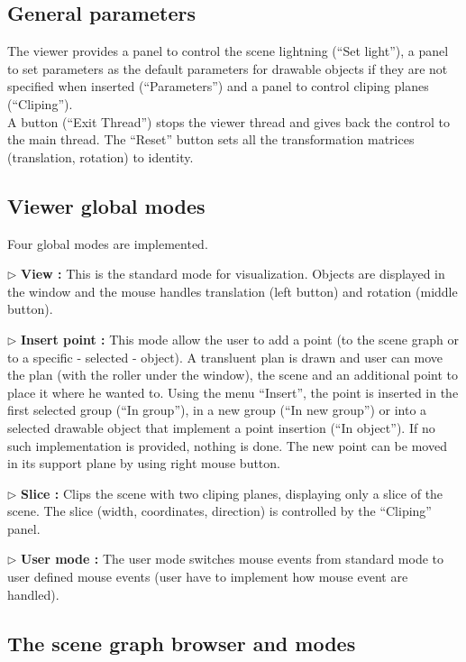 \subsection{General parameters}

The viewer provides a panel to control the scene lightning (``Set
light''), a panel to set parameters as the default parameters for
drawable objects if they are not specified when inserted
(``Parameters'') and a panel to control cliping planes (``Cliping''). \\
A button (``Exit Thread'') stops the viewer thread and gives back the
control to the main thread. The ``Reset'' button sets all the
transformation matrices (translation, rotation) to identity.

\subsection{Viewer global modes}

Four global modes are implemented. 
\begin{description}
\item{$\triangleright$} {\bf View : } This is the standard mode for
visualization. Objects are displayed in the  window and
the mouse handles translation (left button) and rotation (middle button).
\item{$\triangleright$} {\bf Insert point : } This mode allow the user 
to add a point (to the scene graph or to a specific - selected -
object). A transluent plan is drawn and user can move the
plan (with the roller under the window), the scene and an additional point to
place it where he wanted to. Using the menu ``Insert'', the point is
inserted in the first selected group (``In group''), in a new group
(``In new group'') or into a selected drawable object that implement a point
insertion (``In object''). If no such implementation is provided,
nothing is done. The new point can be moved in its support plane by
using right mouse button.
\item{$\triangleright$} {\bf Slice : } Clips the scene with two
cliping planes, displaying only a slice of the scene. The slice
(width, coordinates, direction) is controlled by the ``Cliping''
panel.
\item{$\triangleright$} {\bf User mode : } The user mode switches
mouse events from standard mode to user defined mouse events (user
have to implement how mouse event are handled).  
\end{description}


\subsection{The scene graph browser and modes}

